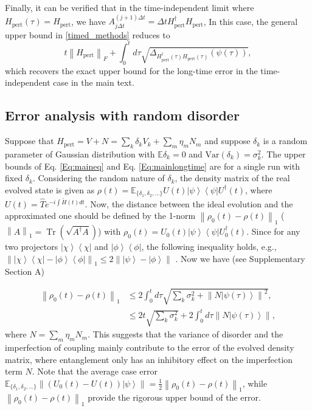 \documentclass[12pt]{article}
\newcommand{\ket}[1]{\left|#1\right\rangle}
\newcommand{\bra}[1]{\left\langle #1\right|}
\newcommand{\norm}[1]{\left\lVert #1\right\rVert}
\newcommand{\Tr}{\operatorname{Tr}}
\begin{document}
Finally, it can be verified that in the time-independent limit where $H_{\text{pert}}(\tau)=H_{\text{pert}}$, we have $A^{(j+1)\Delta t}_{j\Delta t}=\Delta t H^\dagger_{\text{pert}}H_{\text{pert}} $,
In this case, the general upper bound in \eqref{timed_methods} reduces to 
\begin{equation}
     t\norm{H_{\text{pert}}}_F+\int_{0} ^{t} d\tau  \sqrt{\Delta_{{H^\dagger_{\text{pert}}(\tau)H_{\text{pert}}(\tau)}} (\psi(\tau))},
\end{equation}
which recovers the exact upper bound for the long-time error in the time-independent case in the main text.






\subsection*{Error analysis with random disorder}

Suppose that $ H_{\text{pert}} = V+N=\sum_k \delta_k V_k + \sum_m \eta_m N_m$ and suppose $\delta_k$ is a random parameter of  Gaussian distribution with $\mathbb{E} \delta _k=0$ and $\text{Var}(\delta_k)=\sigma^2_k$.  The upper bounds of Eq. \eqref{Eq:maineq}  and Eq. \eqref{Eq:mainlongtime} are for a single run with fixed $\delta_k$. Considering the random nature of $\delta_k$, the density matrix of the real evolved state is given as 
$\rho(t)=  \mathbb{E}_{\{\delta_1,\delta_2,...\}}U (t)\ket{\psi}\bra{\psi}U^\dagger(t)$, where 
$U(t)=\hat{T}e^{-i\int \widetilde{H}(t) dt}$.
Now, the distance between the ideal evolution and the approximated one should be defined by the 1-norm $\norm{\rho_0(t)-\rho(t)}_1$ ($\norm{A}_1=\Tr(\sqrt{A^\dagger A})$) with $\rho_0(t)=U_0(t)\ket{\psi}\bra{\psi}U^\dagger_0(t) $.
Since for any two projectors $\ket{\chi}\bra{\chi}$ and $\ket{\phi}\bra{\phi}$, the following inequality holds, e.g., $\norm{\ket{\chi}\bra{\chi}-\ket{\phi}\bra{\phi}}_1\le 
2 \norm{\ket{\psi}-\ket{\phi}}$ \cite{watrous2018theory}.
Now we have (see Supplementary Section A)

\begin{equation}
\begin{split}
\norm{ \rho_0(t)-\rho(t) }_1 
&\le 2 \int_0 ^t d\tau \sqrt{\sum_k \sigma^2_k+\norm{ N\ket{\psi(\tau)}}^2},\\
&\le 2t \sqrt{\sum_k \sigma^2_k} +2\int_0 ^t d\tau \norm{ N\ket{\psi(\tau)}},
\end{split}
\end{equation}
where $N=\sum_m \eta_m N_m$. 
This suggests that the variance of disorder and the imperfection of coupling mainly contribute to the error of the evolved density matrix, where entanglement only has an inhibitory effect on the imperfection term $N$.
Note that the average case error $ \mathbb{E}_{\{\delta_1,\delta_2,...\}} \norm{(U_0(t)-U(t))\ket{\psi}} =\frac{1}{2}\norm{ \rho_0(t)-\rho(t) }_1$, while $\norm{ \rho_0(t)-\rho(t) }_1$ provide the rigorous upper bound of the error. 
\end{document}
